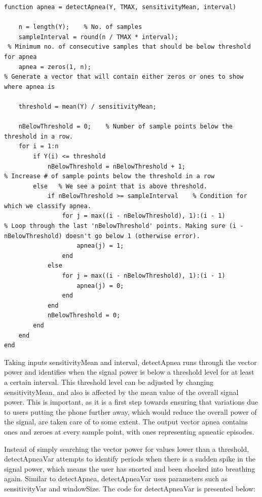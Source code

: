 \begin{lstlisting}
function apnea = detectApnea(Y, TMAX, sensitivityMean, interval)

    n = length(Y);    % No. of samples
    sampleInterval = round(n / TMAX * interval);
 % Minimum no. of consecutive samples that should be below threshold for apnea
    apnea = zeros(1, n);
% Generate a vector that will contain either zeros or ones to show where apnea is
    
    threshold = mean(Y) / sensitivityMean;
    
    nBelowThreshold = 0;    % Number of sample points below the threshold in a row.
    for i = 1:n
        if Y(i) <= threshold
            nBelowThreshold = nBelowThreshold + 1;
% Increase # of sample points below the threshold in a row
        else   % We see a point that is above threshold.
            if nBelowThreshold >= sampleInterval    % Condition for which we classify apnea.
                for j = max((i - nBelowThreshold), 1):(i - 1)
% Loop through the last 'nBelowThreshold' points. Making sure (i - nBelowThreshold) doesn't go below 1 (otherwise error).
                    apnea(j) = 1;
                end
            else
                for j = max((i - nBelowThreshold), 1):(i - 1)
                    apnea(j) = 0;
                end
            end
            nBelowThreshold = 0;
        end
    end
end
\end{lstlisting}

Taking inputs sensitivityMean and interval, detectApnea runs through the vector power and identifies when the signal power is below a threshold level for at least a certain interval. This threshold level can be adjusted by changing sensitivityMean, and also is affected by the mean value of the overall signal power. This is important, as it is a first step towards ensuring that variations due to users putting the phone further away, which would reduce the overall power of the signal, are taken care of to some extent. The output vector apnea contains ones and zeroes at every sample point, with ones representing apneatic episodes.

Instead of simply searching the vector power for values lower than a threshold, detectApneaVar attempts to identify periods when there is a sudden spike in the signal power, which means the user has snorted and been shocked into breathing again. Similar to detectApnea, detectApneaVar uses parameters such as sensitivityVar and windowSize. The code for detectApneaVar is presented below:

